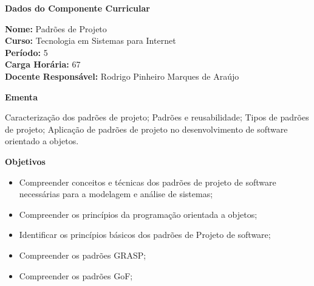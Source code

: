 

\begin{snugshade}\begin{center}\textbf{
	Dados do Componente Curricular
}\end{center}\end{snugshade}

\noindent 	\textbf{Nome:} Padrões de Projeto
\\ 			\textbf{Curso:} Tecnologia em Sistemas para Internet
\\ 			\textbf{Período:} \unit{5}{\degree}
\\ 			\textbf{Carga Horária:} \unit{67}{\hour}
\\ 			\textbf{Docente Responsável:} Rodrigo Pinheiro Marques de Araújo


\begin{snugshade}\begin{center}\textbf{
    Ementa
\vphantom{q}}\end{center}\end{snugshade}

\noindent
Caracterização dos padrões de projeto; Padrões e reusabilidade; Tipos de padrões de projeto; Aplicação de padrões de projeto no desenvolvimento de software orientado a objetos.


\begin{snugshade}\begin{center}\textbf{
    Objetivos
}\end{center}\end{snugshade}


\begin{itemize}

\item Compreender conceitos e técnicas dos padrões de projeto de software necessárias para a modelagem e análise de sistemas;
\item Compreender os princípios da programação orientada a objetos;
\item Identificar os princípios básicos dos padrões de Projeto de software;
\item Compreender os padrões GRASP;
\item Compreender os padrões GoF;

\end{itemize}



